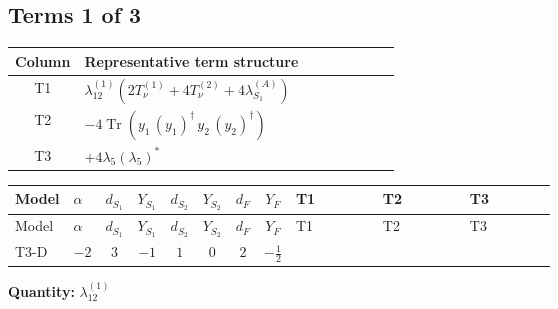 \documentclass[8pt]{article}
\begin{document}
\begin{landscape}
\subsection*{Terms 1 of 3}
\begin{center}
\begin{tabular}{@{}c >{\raggedright\arraybackslash}p{0.82\linewidth}@{}}
\toprule
Column & Representative term structure \\
\midrule
T1 & \(\displaystyle {\lambda_{12}^{(1)}} (2 T_{\nu}^{(1)}+4 T_{\nu}^{(2)}+4 {\lambda_{S_1}^{(A)}})\) \\
\midrule
T2 & \(\displaystyle -4 \operatorname{Tr}\!\left({y_1}\,\left({y_1}\right)^{\dagger}\,{y_2}\,\left({y_2}\right)^{\dagger}\right)\) \\
\midrule
T3 & \(\displaystyle +4 {\lambda_5} \left({\lambda_5}\right)^{*}\) \\
\midrule
\bottomrule
\end{tabular}
\end{center}
\smallskip
\tiny
\begin{longtable}{@{}llcccccc >{\raggedright\arraybackslash}p{0.21\linewidth} >{\raggedright\arraybackslash}p{0.21\linewidth} >{\raggedright\arraybackslash}p{0.21\linewidth}@{}}
\toprule
Model & $\alpha$ & $d_{S_1}$ & $Y_{S_1}$ & $d_{S_2}$ & $Y_{S_2}$ & $d_F$ & $Y_F$ & T1 & T2 & T3 \\
\midrule
\endfirsthead
\toprule
Model & $\alpha$ & $d_{S_1}$ & $Y_{S_1}$ & $d_{S_2}$ & $Y_{S_2}$ & $d_F$ & $Y_F$ & T1 & T2 & T3 \\
\midrule
\endhead
T3-D & $-2$ & $3$ & $-1$ & $1$ & $0$ & $2$ & $-\frac{1}{2}$ & \scriptsize\adjustbox{max width=\linewidth}{$\begin{gathered} {\lambda_{12}^{(1)}} (2 T_{\nu}^{(1)}+4 T_{\nu}^{(2)}+4 {\lambda_{S_1}^{(A)}})\end{gathered}$} & \scriptsize\adjustbox{max width=\linewidth}{$\begin{gathered} -4 \operatorname{Tr}\!\left({y_1}\,\left({y_1}\right)^{\dagger}\,{y_2}\,\left({y_2}\right)^{\dagger}\right)\end{gathered}$} & \scriptsize\adjustbox{max width=\linewidth}{$\begin{gathered} +4 {\lambda_5} \left({\lambda_5}\right)^{*}\end{gathered}$} \\
\midrule
\bottomrule
\end{longtable}
\clearpage
\noindent\textbf{Quantity: }$\lambda_{12}^{(1)}$\par\smallskip

\end{landscape}
\end{document}
